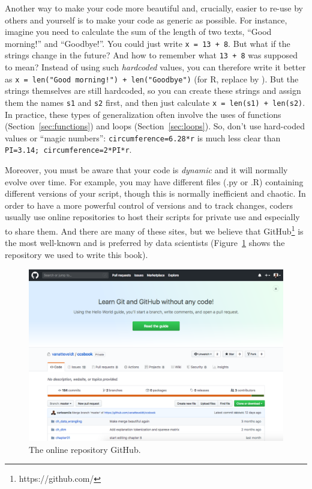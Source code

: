 Another way to make your code more beautiful and, crucially, easier to re-use by others and yourself is to make your code as generic as possible.
For instance, imagine you need to calculate the sum of the length of two texts, ``Good morning!'' and ``Goodbye!''.
You could just write \verb|x = 13 + 8|. But what if the strings change in the future? And how to remember what \verb|13 + 8| was supposed to mean?
Instead of using such \emph{hardcoded} values, you can therefore write it better as \verb|x = len("Good morning!") + len("Goodbye")| (for R, replace  by ).
But the strings themselves are still hardcoded, so you can  create these strings and assign them the names \verb|s1| and \verb|s2| first, and then just calculate \verb|x = len(s1) + len(s2)|. In practice, these types of generalization often involve the uses of functions (Section~\ref{sec:functions}) and loops (Section~\ref{sec:loops}). So, don't use hard-coded values or ``magic numbers'': \verb+circumference=6.28*r+ is much less clear than \verb+PI=3.14; circumference=2*PI*r+.

Moreover, you must be aware that your code is \textit{dynamic} and it will normally evolve over time. For example, you may have different files (.py or .R) containing different versions of your script, though this is normally inefficient and chaotic. In order to have a more powerful control of versions and to track changes, coders usually use online repositories to host their scripts for private use and especially to share them. And there are many of these sites, but we believe that GitHub\footnote{https://github.com/} is the most well-known and is preferred by data scientists (Figure~\ref{fig:github} shows the repository we used to write this book).

\begin{figure}
\centering
\includegraphics[width=0.9\linewidth]{figures/ch04_github.png}
\caption{The online repository GitHub.}
\label{fig:github}
\end{figure}

